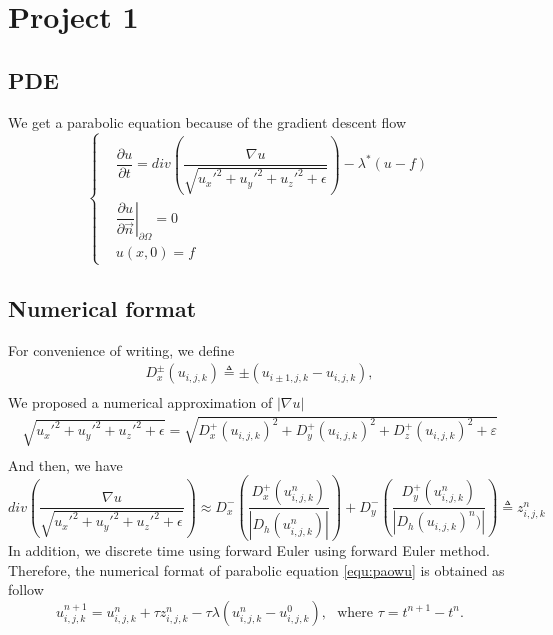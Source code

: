 \documentclass{article}
\begin{document}
\section{Project 1}
\subsection{PDE}
We get a parabolic equation because of the gradient descent flow
\begin{equation}\label{equ:paowu}
  \left\{
  \begin{split}
    &\dfrac{\partial u}{\partial t}=div\left (\dfrac{\nabla u}{\sqrt{u_x'^2+u_y'^2+u_z'^2+\epsilon}}\right)-\lambda^*(u-f) \\
    &\left. \dfrac{\partial u}{\partial \overrightarrow{n}} \right | _{\partial \Omega} =0\\
    &u(x,0)=f
  \end{split}
  \right.
\end{equation}


\subsection{Numerical format}
For convenience of writing, we define
\begin{equation*}
  \begin{array}{c}
      D_x^{\pm}(u_{i,j,k}) \triangleq \pm (u_{i\pm1,j,k}-u_{i,j,k}),\\
   \end{array}
\end{equation*}
We proposed a numerical approximation of $|\nabla u|$
\begin{equation*}
  \begin{array}{c}
    \sqrt{u_x'^2+u_y'^2+u_z'^2+\epsilon} =  \sqrt{D_x ^+ (u_{i,j,k})^2+D_y^+(u_{i,j,k})^2+D_z^+(u_{i,j,k})^2+\varepsilon}\\
  \end{array}
\end{equation*}
And then, we have
\begin{equation}\label{equ:div1}
  div\left (\frac{\nabla u}{\sqrt{u_x'^2+u_y'^2+u_z'^2+\epsilon}}\right) \approx D_x^-\left(\frac{D_x^+(u_{i,j,k}^n)}{|D_h(u_{i,j,k}^n)|}\right)+D_y^-
  \left(\frac{D_y^+(u_{i,j,k}^n)}{|D_h(u_{i,j,k})^n)|}\right) \triangleq z_{i,j,k}^n
\end{equation}
In addition, we discrete time using forward Euler using forward Euler method. Therefore, the numerical format of parabolic equation \eqref{equ:paowu} is obtained as follow
\begin{equation}\label{equ:shuzhi1}
  u_{i,j,k}^{n+1}=u_{i,j,k}^n +\tau z_{i,j,k}^n-\tau \lambda (u_{i,j,k}^n-u_{i,j,k}^0),\ \ \ \text{where }\tau = t^{n+1}-t^n.
\end{equation}
\end{document}
